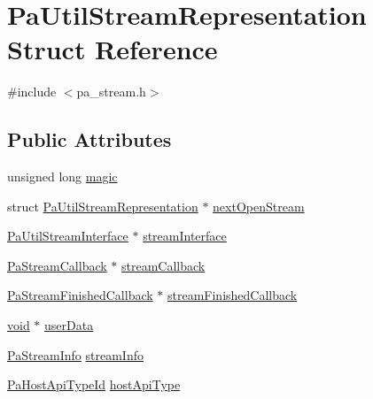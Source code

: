 \hypertarget{struct_pa_util_stream_representation}{}\section{Pa\+Util\+Stream\+Representation Struct Reference}
\label{struct_pa_util_stream_representation}


{\ttfamily \#include $<$pa\+\_\+stream.\+h$>$}

\subsection*{Public Attributes}
\begin{DoxyCompactItemize}
\item 
unsigned long \hyperlink{struct_pa_util_stream_representation_a6f317d637618d5d4fee13c11c65b8c4a}{magic}
\item 
struct \hyperlink{struct_pa_util_stream_representation}{Pa\+Util\+Stream\+Representation} $\ast$ \hyperlink{struct_pa_util_stream_representation_ab920ec2330973059213cf785f1132e28}{next\+Open\+Stream}
\item 
\hyperlink{struct_pa_util_stream_interface}{Pa\+Util\+Stream\+Interface} $\ast$ \hyperlink{struct_pa_util_stream_representation_a08e6fbd36674c306fd09b981e6f9a898}{stream\+Interface}
\item 
\hyperlink{portaudio_8h_a8a60fb2a5ec9cbade3f54a9c978e2710}{Pa\+Stream\+Callback} $\ast$ \hyperlink{struct_pa_util_stream_representation_a87c11103277fc073b4f2ab82e30d48d9}{stream\+Callback}
\item 
\hyperlink{portaudio_8h_ab2530ee0cb756c67726f9074d3482ef2}{Pa\+Stream\+Finished\+Callback} $\ast$ \hyperlink{struct_pa_util_stream_representation_a9132c3be1600907f747c38d64f4a4a3e}{stream\+Finished\+Callback}
\item 
\hyperlink{sound_8c_ae35f5844602719cf66324f4de2a658b3}{void} $\ast$ \hyperlink{struct_pa_util_stream_representation_a5d47c8cae02066d877bc7c670adb61ad}{user\+Data}
\item 
\hyperlink{struct_pa_stream_info}{Pa\+Stream\+Info} \hyperlink{struct_pa_util_stream_representation_a13c2b5318f73dde9a11fd9d874763d4a}{stream\+Info}
\item 
\hyperlink{portaudio_8h_a8eaebe3d39c5ea45598da8f86dc2e5ae}{Pa\+Host\+Api\+Type\+Id} \hyperlink{struct_pa_util_stream_representation_ad37d76303fc568156f4b9bd03beb5fce}{host\+Api\+Type}
\end{DoxyCompactItemize}


